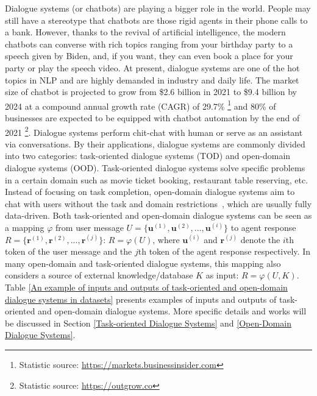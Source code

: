 

\label{intro}
Dialogue systems (or chatbots) are playing a bigger role in the world. People may still have a stereotype that chatbots are those rigid agents in their phone calls to a bank. However, thanks to the revival of artificial intelligence, the modern chatbots can converse with rich topics ranging from your birthday party to a speech given by Biden, and, if you want, they can even book a place for your party or play the speech video. At present, dialogue systems are one of the hot topics in NLP and are highly demanded in industry and daily life. The market size of chatbot is projected to grow from \$2.6 billion in 2021 to \$9.4 billion by 2024 at a compound annual growth rate (CAGR) of 29.7\% \footnote{Statistic source: \url{https://markets.businessinsider.com}} and 80\% of businesses are expected to be equipped with chatbot automation by the end of 2021 \footnote{Statistic source: \url{https://outgrow.co}}.
Dialogue systems perform chit-chat with human or serve as an assistant via conversations. By their applications, dialogue systems are commonly divided into two categories: task-oriented dialogue systems (TOD) and open-domain dialogue systems (OOD). Task-oriented dialogue systems solve specific problems in a certain domain such as movie ticket booking, restaurant table reserving, etc. Instead of focusing on task completion, open-domain dialogue systems aim to chat with users without the task and domain restrictions~, which are usually fully data-driven. Both task-oriented and open-domain dialogue systems can be seen as a mapping $\varphi$ from user message $U = \{\mathrm{\mathbf{u}}^{(1)}, \mathrm{\mathbf{u}}^{(2)}, ... , \mathrm{\mathbf{u}}^{(i)}\}$ to agent response $R = \{\mathrm{\mathbf{r}}^{(1)}, \mathrm{\mathbf{r}}^{(2)}, ... , \mathrm{\mathbf{r}}^{(j)}\}$: $R = \varphi(U)$, where $\mathrm{\mathbf{u}}^{(i)}$ and $\mathrm{\mathbf{r}}^{(j)}$ denote the $i$th token of the user message and the $j$th token of the agent response respectively. In many open-domain and task-oriented dialogue systems, this mapping also considers a source of external knowledge/database $K$ as input: $R = \varphi(U, K)$. Table \ref{An example of inputs and outputs of task-oriented and open-domain dialogue systems in datasets} presents examples of inputs and outputs of task-oriented and open-domain dialogue systems. More specific details and works will be discussed in Section \ref{Task-oriented Dialogue Systems} and \ref{Open-Domain Dialogue Systems}.
